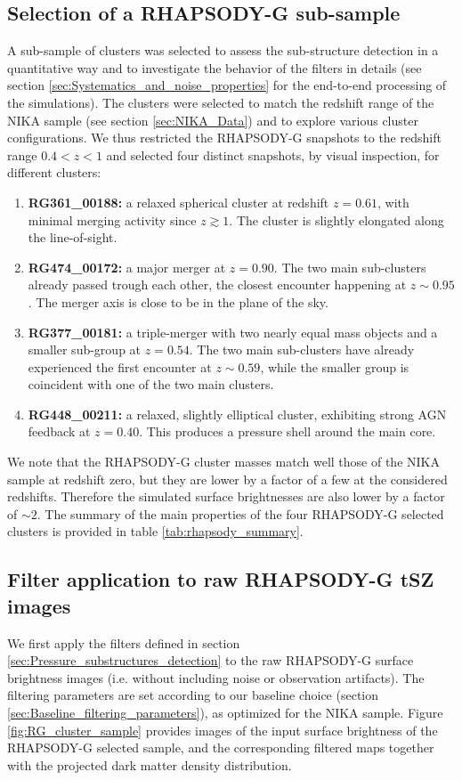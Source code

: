 \documentclass[twocolumn,traditabstract]{aa}
\begin{document}
\subsection{Selection of a RHAPSODY-G sub-sample}\label{sec:Selection_of_a_RHAPSODY-G_sub-sample}
A sub-sample of clusters was selected to assess the sub-structure detection in a quantitative way and to investigate the behavior of the filters in details (see section \ref{sec:Systematics_and_noise_properties} for the end-to-end processing of the simulations). The clusters were selected to match the redshift range of the NIKA sample (see section \ref{sec:NIKA_Data}) and to explore various cluster configurations. We thus restricted the RHAPSODY-G snapshots to the redshift range $0.4<z<1$ and selected four distinct snapshots, by visual inspection, for different clusters:
\begin{enumerate}
\item {\bf RG361\_00188:} a relaxed spherical cluster at redshift $z = 0.61$, with minimal merging activity since $z \gtrsim 1$. The cluster is slightly elongated along the line-of-sight.
\item {\bf RG474\_00172:} a major merger at $z = 0.90$. The two main sub-clusters already passed trough each other, the closest encounter happening at $z \sim 0.95$. The merger axis is close to be in the plane of the sky. 
\item {\bf RG377\_00181:} a triple-merger with two nearly equal mass objects and a smaller sub-group at $z = 0.54$. The two main sub-clusters have already experienced the first encounter at $z \sim 0.59$, while the smaller group is coincident with one of the two main clusters.
\item {\bf RG448\_00211:} a relaxed, slightly elliptical cluster, exhibiting strong AGN feedback at $z = 0.40$. This produces a pressure shell around the main core.
\end{enumerate}
We note that the RHAPSODY-G cluster masses match well those of the NIKA sample at redshift zero, but they are lower by a factor of a few at the considered redshifts. Therefore the simulated surface brightnesses are also lower by a factor of $\sim 2$. The summary of the main properties of the four RHAPSODY-G selected clusters is provided in table \ref{tab:rhapsody_summary}.

\subsection{Filter application to raw RHAPSODY-G tSZ images}
We first apply the filters defined in section \ref{sec:Pressure_substructures_detection} to the raw RHAPSODY-G surface brightness images (i.e. without including noise or observation artifacts). The filtering parameters are set according to our baseline choice (section \ref{sec:Baseline_filtering_parameters}), as optimized for the NIKA sample. Figure \ref{fig:RG_cluster_sample} provides images of the input surface brightness of the RHAPSODY-G selected sample, and the corresponding filtered maps together with the projected dark matter density distribution. 
\end{document}

